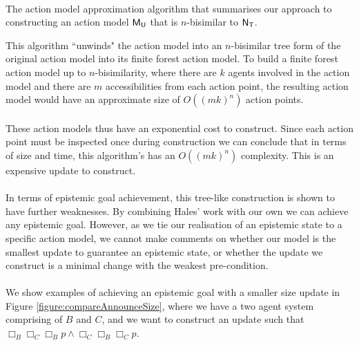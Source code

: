 \begin{algorithm}
\begin{algorithmic}
    \ForAll {$\evt \in \evT$}
    \EndFor\\
		\Return {$\evMM_\evU$}
	\EndFunction
\end{algorithmic}
\caption{The action model approximation algorithm that summarises our approach
to constructing an action model $\evMM_\evU$ that is $n$-bisimilar to
$\mathrm{\mathsf{N}}_\mathrm{\mathsf{T}}$.}
\label{algo:myAlgo}
\end{algorithm}

This algorithm ``unwinds" the action model into an $n$-bisimilar tree form of the
original action model into its finite forest action model.
To build a finite forest action model up to $n$-bisimilarity, where there are
$k$ agents involved in the action model and there are $m$ accessibilities from
each action point, the resulting action model would have an approximate size of
$O((mk)^n)$ action points.\\
\\
These action models thus have an exponential cost to construct.
Since each action point must be inspected once during construction we can conclude that in
terms of size and time, this algorithm's has an $O((mk)^n)$ complexity.
This is an expensive update to construct.\\
\\
In terms of epistemic goal achievement, this tree-like construction is shown to
have further weaknesses.
By combining Hales' \cite{hales13synthesis} work with our own we can achieve any
epistemic goal.
However, as we tie our realisation of an epistemic state to a specific action
model, we cannot make comments on whether our model is the smallest update to
guarantee an epistemic state, or whether the update we construct is a minimal
change with the weakest pre-condition.\\
\\
We show examples of achieving an epistemic goal with a smaller size update in Figure
\ref{figure:compareAnnounceSize}, where we have a two agent system comprising of
$B$ and $C$, and we want to construct an update such that $\Box_B \Box_C \Box_B
p \land \Box_C \Box_B \Box_C p$.

